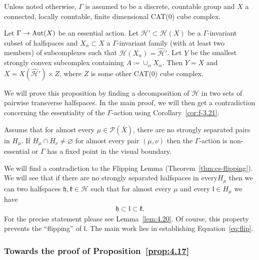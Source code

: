 Unless noted otherwise, \(\Gamma\) is assumed to be a discrete, countable group and \(X\) a connected, locally countable, finite dimensional CAT(0) cube complex.

\begin{prop}[{\cite[Proposition~4.17]{MR3509968}}]
  \label{prop:4.17}
  Let \(\Gamma \to \operatorname{Aut}(X)\) be an essential action. Let \(\mathcal{H}' \subset \mathcal{H}(X)\) be a \(\Gamma\)-invariant subset of halfspaces and \(X_\alpha \subset X\) a \(\Gamma\)-invariant family (with at least two members) of subcomplexes such that \(\mathcal{\hat H}(X_\alpha) = \mathcal{\hat H}'\). Let \(Y\) be the smallest strongly convex subcomplex containing \(A \coloneqq \cup_\alpha X_\alpha\). Then \(Y = X\) and \(X = X(\mathcal{\hat H}') \times Z\), where \(Z\) is some other CAT(0) cube complex.
\end{prop}

We will prove this proposition by finding a decomposition of \(\mathcal{H}\) in two sets of pairwise transverse halfspaces. In the main proof, we will then get a contradiction concerning the essentiality of the \(\Gamma\)-action using Corollary~\ref{cor:f-3.21}.

\begin{prop}[{\cite[Corollary~4.21]{MR3509968}}]
  \label{prop:4.21}
  Assume that for almost every \(\mu \in \mathcal{P}(\bar X)\), there are no strongly separated pairs in \(H_\mu\). If \(H_\mu \cap H_\nu \neq \varnothing\) for almost every pair \((\mu, \nu)\) then the \(\Gamma\)-action is non-essential or \(\Gamma\) has a fixed point in the visual boundary.
\end{prop}

We will find a contradiction to the Flipping Lemma (Theorem~\ref{thm:cs-flipping}). We will see that if there are no strongly separated halfspaces in every\(H_\mu\) then we can two halfspaces \(\mathfrak{h}, \mathfrak{k} \in \mathcal{H}\) such that for almost every \(\mu\) and every \(\mathfrak{l} \in H_\mu\) we have
\begin{align}
  \mathfrak{h} \subset \mathfrak{l} \subset \mathfrak{k}.\label{eq:flip}
\end{align}
For the precise statement please see Lemma~\ref{lem:4.20}. Of course, this property prevents the \enquote{flipping} of \(\mathfrak{l}\). The main work lies in establishing Equation~\eqref{eq:flip}.

\subsubsection*{Towards the proof of Proposition~\ref{prop:4.17}}

